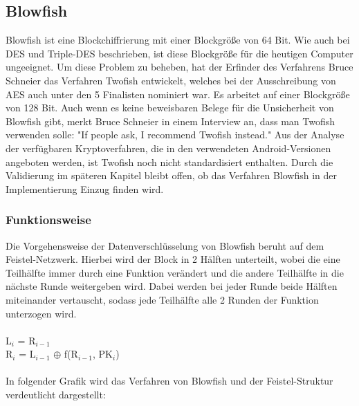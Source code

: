 \documentclass[10pt, a4paper,headsepline]{scrreprt}
\begin{document}
\subsection{Blowfish}
Blowfish ist eine Blockchiffrierung mit einer Blockgröße von 64 Bit. Wie auch bei DES und Triple-DES beschrieben, ist diese Blockgröße für die heutigen Computer ungeeignet. Um diese Problem zu beheben, hat der Erfinder des Verfahrens Bruce Schneier das Verfahren Twofish entwickelt, welches bei der Ausschreibung von AES auch unter den 5 Finalisten nominiert war. Es arbeitet auf einer Blockgröße von 128 Bit. Auch wenn es keine beweisbaren Belege für die Unsicherheit von Blowfish gibt, merkt Bruce Schneier in einem Interview an, dass man Twofish verwenden solle: "If people ask, I recommend Twofish instead." \cite{website:compworld-schneier}
Aus der Analyse der verfügbaren Kryptoverfahren, die in den verwendeten Android-Versionen angeboten werden, ist Twofish noch nicht standardisiert enthalten. Durch die Validierung im späteren Kapitel bleibt offen, ob das Verfahren Blowfish in der Implementierung Einzug finden wird.

\subsubsection{Funktionsweise}
Die Vorgehensweise der Datenverschlüsselung von Blowfish beruht auf dem Feistel-Netzwerk. Hierbei wird der Block in 2 Hälften unterteilt, wobei die eine Teilhälfte immer durch eine Funktion verändert und die andere Teilhälfte in die nächste Runde weitergeben wird. Dabei werden bei jeder Runde beide Hälften miteinander vertauscht, sodass jede Teilhälfte alle 2 Runden der Funktion unterzogen wird. \\ \\
L$_{i}$ = R$_{i-1}$ \\
R$_{i}$ = L$_{i-1}$ $\oplus$ f(R$_{i-1}$, PK$_{i}$) \\ \\
In folgender Grafik wird das Verfahren von Blowfish und der Feistel-Struktur verdeutlicht dargestellt: 
\end{document}
